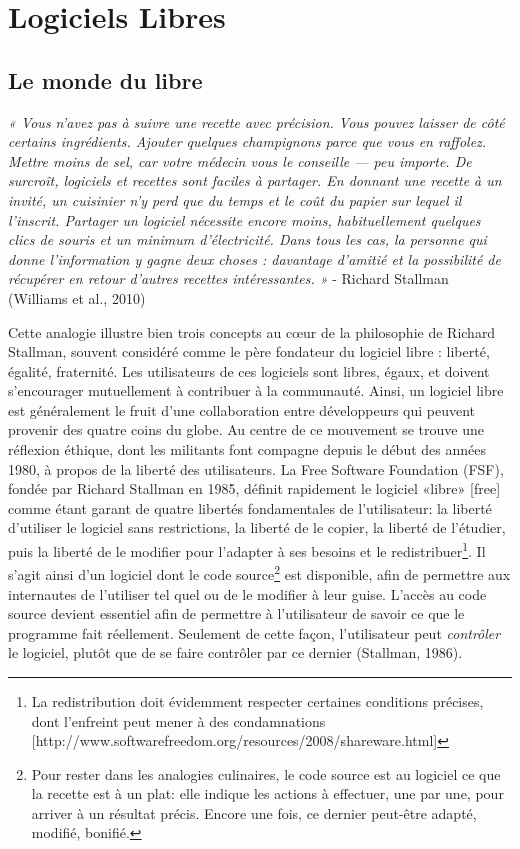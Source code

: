 \documentclass[
  letterpaper,
  DIV=11,
  numbers=noendperiod]{scrreprt}
\begin{document}
\section{Logiciels Libres}\label{logiciels-libres}

\subsection{Le monde du libre}\label{le-monde-du-libre}

\emph{« Vous n'avez pas à suivre une recette avec précision. Vous pouvez
laisser de côté certains ingrédients. Ajouter quelques champignons parce
que vous en raffolez. Mettre moins de sel, car votre médecin vous le
conseille --- peu importe. De surcroît, logiciels et recettes sont
faciles à partager. En donnant une recette à un invité, un cuisinier n'y
perd que du temps et le coût du papier sur lequel il l'inscrit. Partager
un logiciel nécessite encore moins, habituellement quelques clics de
souris et un minimum d'électricité. Dans tous les cas, la personne qui
donne l'information y gagne deux choses : davantage d'amitié et la
possibilité de récupérer en retour d'autres recettes intéressantes. »} -
Richard Stallman (Williams et al., 2010)

Cette analogie illustre bien trois concepts au cœur de la philosophie de
Richard Stallman, souvent considéré comme le père fondateur du logiciel
libre : liberté, égalité, fraternité. Les utilisateurs de ces logiciels
sont libres, égaux, et doivent s'encourager mutuellement à contribuer à
la communauté. Ainsi, un logiciel libre est généralement le fruit d'une
collaboration entre développeurs qui peuvent provenir des quatre coins
du globe. Au centre de ce mouvement se trouve une réflexion éthique,
dont les militants font compagne depuis le début des années 1980, à
propos de la liberté des utilisateurs. La Free Software Foundation
(FSF), fondée par Richard Stallman en 1985, définit rapidement le
logiciel «libre» {[}free{]} comme étant garant de quatre libertés
fondamentales de l'utilisateur: la liberté d'utiliser le logiciel sans
restrictions, la liberté de le copier, la liberté de l'étudier, puis la
liberté de le modifier pour l'adapter à ses besoins et le
redistribuer\footnote{La redistribution doit évidemment respecter
  certaines conditions précises, dont l'enfreint peut mener à des
  condamnations
  {[}http://www.softwarefreedom.org/resources/2008/shareware.html{]}}.
Il s'agit ainsi d'un logiciel dont le code source\footnote{Pour rester
  dans les analogies culinaires, le code source est au logiciel ce que
  la recette est à un plat: elle indique les actions à effectuer, une
  par une, pour arriver à un résultat précis. Encore une fois, ce
  dernier peut-être adapté, modifié, bonifié.} est disponible, afin de
permettre aux internautes de l'utiliser tel quel ou de le modifier à
leur guise. L'accès au code source devient essentiel afin de permettre à
l'utilisateur de savoir ce que le programme fait réellement. Seulement
de cette façon, l'utilisateur peut \emph{contrôler} le logiciel, plutôt
que de se faire contrôler par ce dernier (Stallman, 1986).
\end{document}
